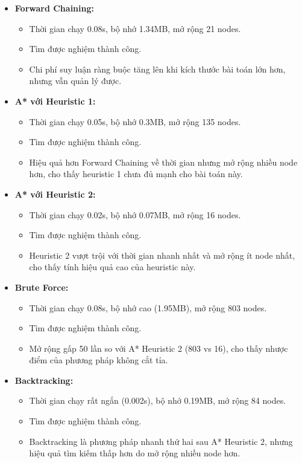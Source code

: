 \begin{itemize}
\item \textbf{Forward Chaining:}
\begin{itemize}
    \item Thời gian chạy 0.08s, bộ nhớ 1.34MB, mở rộng 21 nodes.
    \item Tìm được nghiệm thành công.
    \item Chi phí suy luận ràng buộc tăng lên khi kích thước bài toán lớn hơn, nhưng vẫn quản lý được.
\end{itemize}

\item \textbf{A* với Heuristic 1:}
\begin{itemize}
    \item Thời gian chạy 0.05s, bộ nhớ 0.3MB, mở rộng 135 nodes.
    \item Tìm được nghiệm thành công.
    \item Hiệu quả hơn Forward Chaining về thời gian nhưng mở rộng nhiều node hơn, cho thấy heuristic 1 chưa đủ mạnh cho bài toán này.
\end{itemize}

\item \textbf{A* với Heuristic 2:}
\begin{itemize}
    \item Thời gian chạy 0.02s, bộ nhớ 0.07MB, mở rộng 16 nodes.
    \item Tìm được nghiệm thành công.
    \item Heuristic 2 vượt trội với thời gian nhanh nhất và mở rộng ít node nhất, cho thấy tính hiệu quả cao của heuristic này.
\end{itemize}

\item \textbf{Brute Force:}
\begin{itemize}
    \item Thời gian chạy 0.08s, bộ nhớ cao (1.95MB), mở rộng 803 nodes.
    \item Tìm được nghiệm thành công.
    \item Mở rộng gấp 50 lần so với A* Heuristic 2 (803 vs 16), cho thấy nhược điểm của phương pháp không cắt tỉa.
\end{itemize}

\item \textbf{Backtracking:}
\begin{itemize}
    \item Thời gian chạy rất ngắn (0.002s), bộ nhớ 0.19MB, mở rộng 84 nodes.
    \item Tìm được nghiệm thành công.
    \item Backtracking là phương pháp nhanh thứ hai sau A* Heuristic 2, nhưng hiệu quả tìm kiếm thấp hơn do mở rộng nhiều node hơn.
\end{itemize}

\end{itemize}

